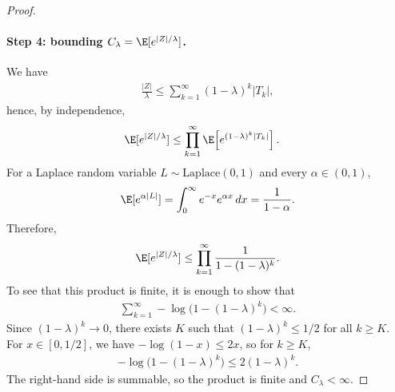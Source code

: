 \begin{proof}
    \paragraph{Step 4: bounding $C_\lambda = \E[e^{|Z|/\lambda}]$.}
    We have
    \begin{align}
        \frac{|Z|}{\lambda}
        \le
        \sum_{k=1}^\infty (1-\lambda)^k |T_k|,
    \end{align}
    hence, by independence,
    \begin{align}
        \E[e^{|Z|/\lambda}]
         & \le
        \prod_{k=1}^\infty \E\!\left[e^{(1-\lambda)^k |T_k|}\right].
    \end{align}
    For a Laplace random variable $L\sim\mathrm{Laplace}(0,1)$ and every $\alpha\in(0,1)$,
    \begin{align}
        \E[e^{\alpha|L|}]
        =
        \int_0^\infty e^{-x}e^{\alpha x}\,dx
        =
        \frac{1}{1-\alpha}.
    \end{align}
    Therefore,
    \begin{align}
        \E[e^{|Z|/\lambda}]
        \le
        \prod_{k=1}^\infty \frac{1}{1-(1-\lambda)^k}.
    \end{align}
    To see that this product is finite, it is enough to show that
    \begin{align}
        \sum_{k=1}^\infty -\log\bigl(1-(1-\lambda)^k\bigr)<\infty.
    \end{align}
    Since $(1-\lambda)^k\to 0$, there exists $K$ such that $(1-\lambda)^k\le 1/2$ for all $k\ge K$.
    For $x\in[0,1/2]$, we have $-\log(1-x)\le 2x$, so for $k\ge K$,
    \begin{align}
        -\log\bigl(1-(1-\lambda)^k\bigr)\le 2(1-\lambda)^k.
    \end{align}
    The right-hand side is summable, so the product is finite and $C_\lambda<\infty$.
\end{proof}
